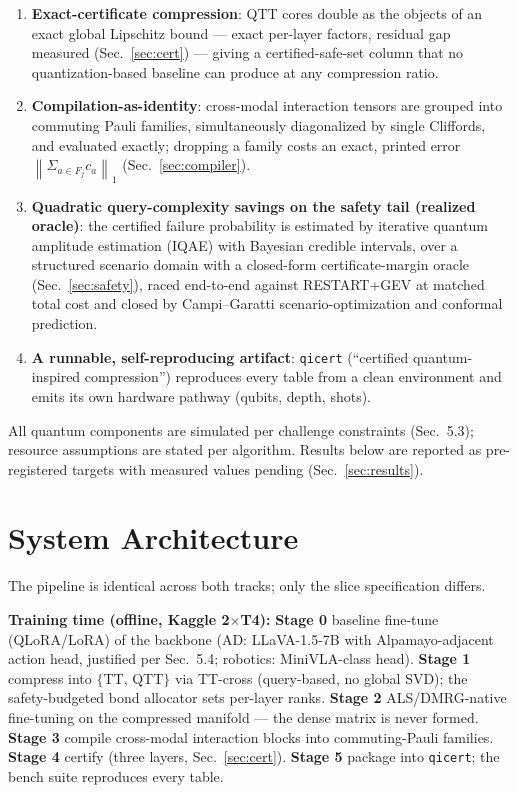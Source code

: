 \documentclass[conference,10pt]{IEEEtran}
\newcommand{\norm}[1]{\left\lVert #1 \right\rVert}
\begin{document}
\begin{enumerate}
\item \textbf{Exact-certificate compression}: QTT cores double as the objects
of an exact global Lipschitz bound --- exact per-layer factors, residual gap
measured (Sec.~\ref{sec:cert}) --- giving a certified-safe-set column that no
quantization-based baseline can produce at any compression ratio.
\item \textbf{Compilation-as-identity}: cross-modal interaction tensors are
grouped into commuting Pauli families, simultaneously diagonalized by single
Cliffords, and evaluated exactly; dropping a family costs an exact, printed
error $\norm{\Sigma_{a\in F_j} c_a}_1$ (Sec.~\ref{sec:compiler}).
\item \textbf{Quadratic query-complexity savings on the safety tail (realized
oracle)}: the certified failure probability is estimated by iterative quantum
amplitude estimation (IQAE) with Bayesian credible intervals, over a
structured scenario domain with a closed-form certificate-margin oracle
(Sec.~\ref{sec:safety}), raced end-to-end against RESTART+GEV at matched total
cost and closed by Campi--Garatti scenario-optimization and conformal
prediction.
\item \textbf{A runnable, self-reproducing artifact}: \texttt{qicert}
(``certified quantum-inspired compression'') reproduces every table from a clean
environment and emits its own hardware pathway (qubits, depth, shots).
\end{enumerate}

All quantum components are simulated per challenge constraints (Sec.~5.3);
resource assumptions are stated per algorithm. Results below are reported as
pre-registered targets with measured values pending (Sec.~\ref{sec:results}).

\section{System Architecture}
\label{sec:arch}

The pipeline is identical across both tracks; only the slice specification
differs.

\textbf{Training time (offline, Kaggle 2$\times$T4):}
\textbf{Stage 0} baseline fine-tune (QLoRA/LoRA) of the backbone
(AD: LLaVA-1.5-7B with Alpamayo-adjacent action head, justified per Sec.~5.4;
robotics: MiniVLA-class head). \textbf{Stage 1} compress into $\{$TT, QTT$\}$
via TT-cross (query-based, no global SVD); the safety-budgeted bond allocator
sets per-layer ranks. \textbf{Stage 2} ALS/DMRG-native fine-tuning on the
compressed manifold --- the dense matrix is never formed. \textbf{Stage 3}
compile cross-modal interaction blocks into commuting-Pauli families.
\textbf{Stage 4} certify (three layers, Sec.~\ref{sec:cert}). \textbf{Stage 5}
package into \texttt{qicert}; the bench suite reproduces every table.
\end{document}
